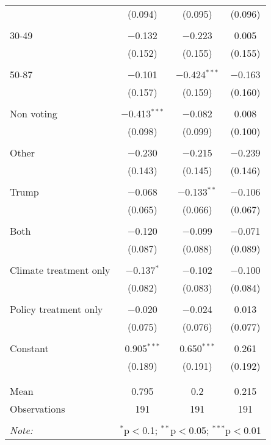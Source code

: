 \begin{tabular}{@{\extracolsep{5pt}}lccc}
  & (0.094) & (0.095) & (0.096) \\ 
  & & & \\ 
 30-49 & $-$0.132 & $-$0.223 & 0.005 \\ 
  & (0.152) & (0.155) & (0.155) \\ 
  & & & \\ 
 50-87 & $-$0.101 & $-$0.424$^{***}$ & $-$0.163 \\ 
  & (0.157) & (0.159) & (0.160) \\ 
  & & & \\ 
 Non voting & $-$0.413$^{***}$ & $-$0.082 & 0.008 \\ 
  & (0.098) & (0.099) & (0.100) \\ 
  & & & \\ 
 Other & $-$0.230 & $-$0.215 & $-$0.239 \\ 
  & (0.143) & (0.145) & (0.146) \\ 
  & & & \\ 
 Trump & $-$0.068 & $-$0.133$^{**}$ & $-$0.106 \\ 
  & (0.065) & (0.066) & (0.067) \\ 
  & & & \\ 
 Both & $-$0.120 & $-$0.099 & $-$0.071 \\ 
  & (0.087) & (0.088) & (0.089) \\ 
  & & & \\ 
 Climate treatment only & $-$0.137$^{*}$ & $-$0.102 & $-$0.100 \\ 
  & (0.082) & (0.083) & (0.084) \\ 
  & & & \\ 
 Policy treatment only & $-$0.020 & $-$0.024 & 0.013 \\ 
  & (0.075) & (0.076) & (0.077) \\ 
  & & & \\ 
 Constant & 0.905$^{***}$ & 0.650$^{***}$ & 0.261 \\ 
  & (0.189) & (0.191) & (0.192) \\ 
  & & & \\ 
\hline \\[-1.8ex] 
Mean & 0.795 & 0.2 & 0.215 \\ 
Observations & 191 & 191 & 191 \\ 
\hline 
\hline \\[-1.8ex] 
\textit{Note:}  & \multicolumn{3}{r}{$^{*}$p$<$0.1; $^{**}$p$<$0.05; $^{***}$p$<$0.01} \\ 
\end{tabular} 
